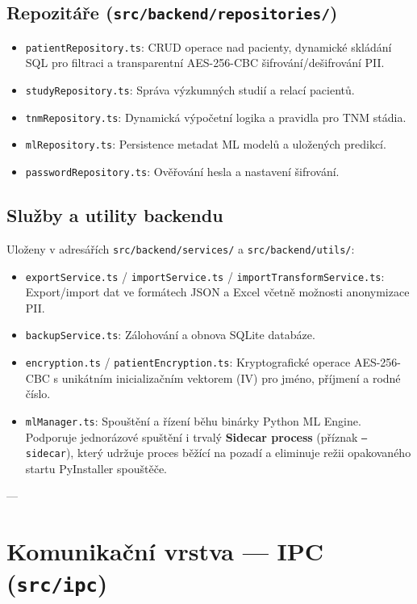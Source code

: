 \documentclass[12pt,a4paper]{article}
\begin{document}
\subsection{Repozitáře (\texttt{src/backend/repositories/})}
\begin{itemize}
    \item \texttt{patientRepository.ts}: CRUD operace nad pacienty, dynamické skládání SQL pro filtraci a transparentní AES-256-CBC šifrování/dešifrování PII.
    \item \texttt{studyRepository.ts}: Správa výzkumných studií a relací pacientů.
    \item \texttt{tnmRepository.ts}: Dynamická výpočetní logika a pravidla pro TNM stádia.
    \item \texttt{mlRepository.ts}: Persistence metadat ML modelů a uložených predikcí.
    \item \texttt{passwordRepository.ts}: Ověřování hesla a nastavení šifrování.
\end{itemize}

\subsection{Služby a utility backendu}
Uloženy v adresářích \texttt{src/backend/services/} a \texttt{src/backend/utils/}:
\begin{itemize}
    \item \texttt{exportService.ts} / \texttt{importService.ts} / \texttt{importTransformService.ts}: Export/import dat ve formátech JSON a Excel včetně možnosti anonymizace PII.
    \item \texttt{backupService.ts}: Zálohování a obnova SQLite databáze.
    \item \texttt{encryption.ts} / \texttt{patientEncryption.ts}: Kryptografické operace AES-256-CBC s unikátním inicializačním vektorem (IV) pro jméno, příjmení a rodné číslo.
    \item \texttt{mlManager.ts}: Spouštění a řízení běhu binárky Python ML Engine. Podporuje jednorázové spuštění i trvalý \textbf{Sidecar process} (příznak \texttt{--sidecar}), který udržuje proces běžící na pozadí a eliminuje režii opakovaného startu PyInstaller spouštěče.
\end{itemize}

---

\section{Komunikační vrstva --- IPC (\texttt{src/ipc})}
\end{document}
